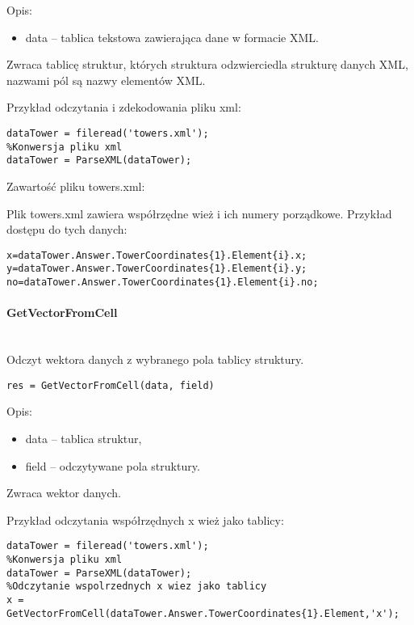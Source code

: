 Opis:
\begin{itemize}
\item data -- tablica tekstowa zawierająca dane w formacie XML.
\end{itemize}

Zwraca tablicę struktur, których struktura odzwierciedla strukturę danych XML, nazwami pól są nazwy elementów XML.

Przykład odczytania i zdekodowania pliku xml:
\begin{lstlisting}[style=Matlab-editor]
%Odczytanie pliku xml
dataTower = fileread('towers.xml');
%Konwersja pliku xml
dataTower = ParseXML(dataTower);
\end{lstlisting}

Zawartość pliku towers.xml:


Plik towers.xml zawiera współrzędne wież i ich numery porządkowe. Przykład dostępu do tych danych:
\begin{lstlisting}[style=Matlab-editor]
x=dataTower.Answer.TowerCoordinates{1}.Element{i}.x;
y=dataTower.Answer.TowerCoordinates{1}.Element{i}.y;
no=dataTower.Answer.TowerCoordinates{1}.Element{i}.no;
\end{lstlisting}

\paragraph{GetVectorFromCell} \hspace{0pt} \\
Odczyt wektora danych z wybranego pola tablicy struktury.
\begin{lstlisting}[style=Matlab-editor]
res = GetVectorFromCell(data, field)
\end{lstlisting}

Opis:
\begin{itemize}
\item data -- tablica struktur,
\item field -- odczytywane pola struktury.
\end{itemize}

Zwraca wektor danych.

Przykład odczytania współrzędnych x wież jako tablicy:
\begin{lstlisting}[style=Matlab-editor]
%Odczytanie pliku xml
dataTower = fileread('towers.xml');
%Konwersja pliku xml
dataTower = ParseXML(dataTower);
%Odczytanie wspolrzednych x wiez jako tablicy
x = GetVectorFromCell(dataTower.Answer.TowerCoordinates{1}.Element,'x');
\end{lstlisting}

